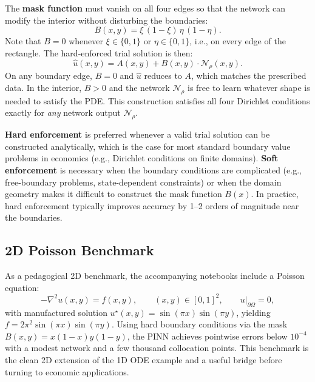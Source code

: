 \documentclass[11pt,a4paper]{report}
\newcommand{\emphc}[1]{\textcolor{harvardcrimson}{\textbf{#1}}}
\begin{document}
The \emphc{mask function} must vanish on all four edges so that the network can modify the interior without disturbing the boundaries:
\begin{equation}
B(x,y) = \xi\,(1-\xi)\,\eta\,(1-\eta).
\end{equation}
Note that $B = 0$ whenever $\xi \in \{0,1\}$ or $\eta \in \{0,1\}$, i.e., on every edge of the rectangle.  The hard-enforced trial solution is then:
\begin{equation}
\hat{u}(x,y) = A(x,y) + B(x,y) \cdot \mathcal{N}_\rho(x,y).
\end{equation}
On any boundary edge, $B=0$ and $\hat{u}$ reduces to $A$, which matches the prescribed data.  In the interior, $B > 0$ and the network $\mathcal{N}_\rho$ is free to learn whatever shape is needed to satisfy the PDE.  This construction satisfies all four Dirichlet conditions exactly for \emph{any} network output $\mathcal{N}_\rho$.

\begin{keyinsightbox}
\textbf{Hard enforcement} is preferred whenever a valid trial solution can be constructed analytically, which is the case for most standard boundary value problems in economics (e.g., Dirichlet conditions on finite domains).  \textbf{Soft enforcement} is necessary when the boundary conditions are complicated (e.g., free-boundary problems, state-dependent constraints) or when the domain geometry makes it difficult to construct the mask function $B(x)$.  In practice, hard enforcement typically improves accuracy by 1--2 orders of magnitude near the boundaries.
\end{keyinsightbox}

\subsection{2D Poisson Benchmark}

As a pedagogical 2D benchmark, the accompanying notebooks include a Poisson equation:
\begin{equation}
-\nabla^2 u(x,y) = f(x,y), \qquad (x,y) \in [0,1]^2, \qquad u\big|_{\partial\Omega} = 0,
\end{equation}
with manufactured solution $u^\star(x,y) = \sin(\pi x)\sin(\pi y)$, yielding $f = 2\pi^2\sin(\pi x)\sin(\pi y)$.  Using hard boundary conditions via the mask $B(x,y) = x(1-x)y(1-y)$, the PINN achieves pointwise errors below $10^{-4}$ with a modest network and a few thousand collocation points.  This benchmark is the clean 2D extension of the 1D ODE example and a useful bridge before turning to economic applications.
\end{document}
